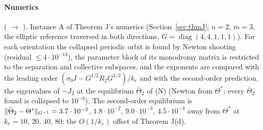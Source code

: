 \paragraph{Numerics} ( $\to$ ).
Instance A of Theorem J's numerics (Section~\ref{sec:thmJ}; $n = 2$, $m = 3$, the elliptic reference traversed in both
directions, $G = \operatorname{diag}(4,4,1,1,1)$). For each orientation the collapsed periodic orbit is found by
Newton shooting (residual $\le4\cdot10^{-13}$), the parameter block of its monodromy matrix is restricted to the
separation and collective subspaces, and the exponents are compared with the leading order
$(\sigma_0I - G^{1/2}R_2G^{1/2})/k_e$ and with the second-order prediction, the eigenvalues of $-J_2$ at the
equilibrium $\bar\Theta_2$ of (N) (Newton from $\Theta^*$; every $\bar\Theta_2$ found is collapsed to $10^{-8}$). The
second-order equilibrium is $\lVert \bar\Theta_2 - \Theta^*\rVert_{G^{-1}} = 3.7\cdot10^{-2}$, $1.8\cdot10^{-2}$,
$9.0\cdot10^{-3}$, $4.5\cdot10^{-3}$ away from $\Theta^*$ at $k_e = 10$, $20$, $40$, $80$: the $O(1/k_e)$ offset of
Theorem J(d).
